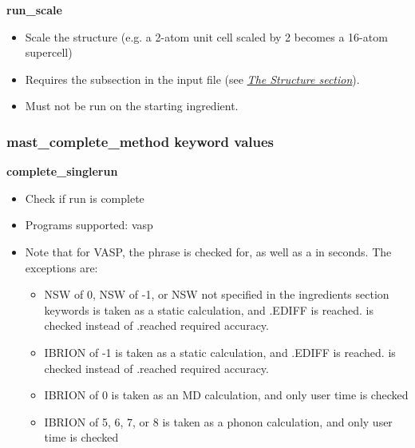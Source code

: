 \documentclass[letterpaper,10pt,english]{sphinxmanual}
\begin{document}
\textbf{run\_scale}
\begin{itemize}
\item {} 
Scale the structure (e.g. a 2-atom unit cell scaled by 2 becomes a 16-atom supercell)

\item {} 
Requires the  subsection in the input file (see {\hyperref[3_1_1_structure::doc]{\emph{The Structure section}}}).

\item {} 
Must not be run on the starting ingredient.

\end{itemize}


\subsubsection{mast\_complete\_method keyword values}
\label{3_1_2_ingredients:mast-complete-method-keyword-values}
\textbf{complete\_singlerun}
\begin{itemize}
\item {} 
Check if run is complete

\item {} 
Programs supported: vasp

\item {} 
Note that for VASP, the phrase  is checked for, as well as a  in seconds. The exceptions are:
\begin{itemize}
\item {} 
NSW of 0, NSW of -1, or NSW not specified in the ingredients section keywords is taken as a static calculation, and .EDIFF is reached. is checked instead of .reached required accuracy.

\item {} 
IBRION of -1 is taken as a static calculation, and .EDIFF is  reached. is checked instead of .reached required accuracy.

\item {} 
IBRION of 0 is taken as an MD calculation, and only user time is checked

\item {} 
IBRION of 5, 6, 7, or 8 is taken as a phonon calculation, and only user time is checked

\end{itemize}

\end{itemize}
\end{document}

